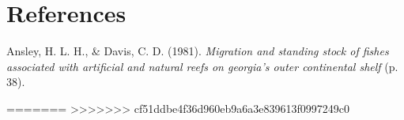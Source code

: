\documentclass[
  11pt,
  letterpaper,
  oneside,
  open=any]{scrbook}
\newlength{\cslhangindent}
\newlength{\cslentryspacingunit} %
\newenvironment{CSLReferences}[2] %
 {%
  \setlength{\parindent}{0pt}
  \ifodd #1
  \let\oldpar\par
  \def\par{\hangindent=\cslhangindent\oldpar}
  \fi
  \setlength{\parskip}{#2\cslentryspacingunit}
 }%
 {}
\begin{document}

\hypertarget{references-2}{%
\chapter*{References}\label{references-2}}


\hypertarget{refs}{}
\begin{CSLReferences}{1}{0}
\leavevmode{}%
Ansley, H. L. H., \& Davis, C. D. (1981). \emph{Migration and standing
stock of fishes associated with artificial and natural reefs on
georgia{'}s outer continental shelf} (p. 38).

\end{CSLReferences}

=======
>>>>>>> cf51ddbe4f36d960eb9a6a3e839613f0997249c0

\backmatter
\end{document}
